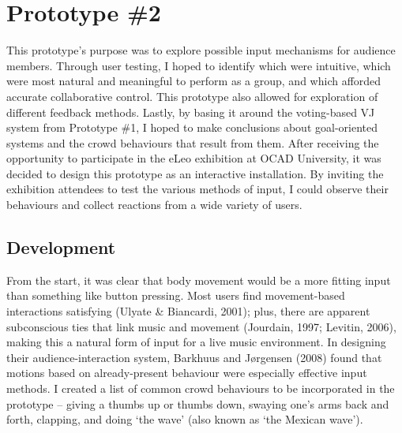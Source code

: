 
\section{Prototype \#2}

This prototype's purpose was to explore possible input mechanisms for audience members. Through user testing, I hoped to identify which were intuitive, which were most natural and meaningful to perform as a group, and which afforded accurate collaborative control.   This prototype also allowed for exploration of different feedback methods. Lastly, by basing it around the voting-based VJ system from Prototype \#1, I hoped to make conclusions about goal-oriented systems and the crowd behaviours that result from them. After receiving the opportunity to participate in the eLeo exhibition at OCAD University, it was decided to design this prototype as an interactive installation. By inviting the exhibition attendees to test the various methods of input, I could observe their behaviours and collect reactions from a wide variety of users.


\subsection{Development}

From the start, it was clear that body movement would be a more fitting input than something like button pressing. Most users find movement-based interactions satisfying (Ulyate \& Biancardi, 2001); plus, there are apparent subconscious ties that link music and movement (Jourdain, 1997; Levitin, 2006), making this a natural form of input for a live music environment. In designing their audience-interaction system, Barkhuus and J{\o}rgensen (2008) found that motions based on already-present behaviour were especially effective input methods. I created a list of common crowd behaviours to be incorporated in the prototype -- giving a thumbs up or thumbs down, swaying one's arms back and forth, clapping, and doing `the wave' (also known as `the Mexican wave').


